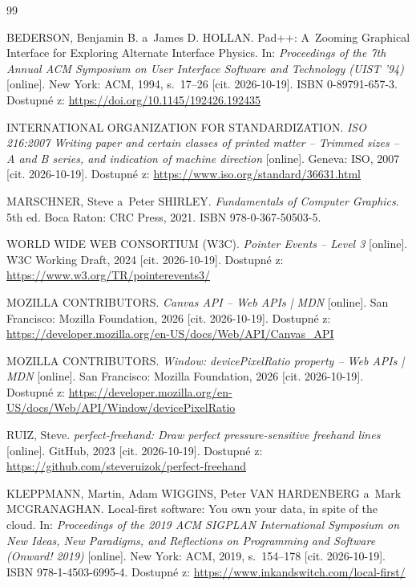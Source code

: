 \documentclass[12pt, a4paper, oneside]{article}
\begin{document}
\begingroup
\sloppy
\renewcommand{\section}[2]{}%
\begin{thebibliography}{99}

    BEDERSON, Benjamin B. a~James D. HOLLAN. Pad++: A~Zooming Graphical Interface for Exploring Alternate Interface Physics. In: \textit{Proceedings of the 7th Annual ACM Symposium on User Interface Software and Technology (UIST '94)} [online]. New York: ACM, 1994, s.~17--26 [cit. 2026-10-19]. ISBN 0-89791-657-3. Dostupné z: \url{https://doi.org/10.1145/192426.192435}

    INTERNATIONAL ORGANIZATION FOR STANDARDIZATION. \textit{ISO 216:2007 Writing paper and certain classes of printed matter -- Trimmed sizes -- A and B series, and indication of machine direction} [online]. Geneva: ISO, 2007 [cit. 2026-10-19]. Dostupné z: \url{https://www.iso.org/standard/36631.html}

    MARSCHNER, Steve a~Peter SHIRLEY. \textit{Fundamentals of Computer Graphics}. 5th ed. Boca Raton: CRC Press, 2021. ISBN 978-0-367-50503-5.

    WORLD WIDE WEB CONSORTIUM (W3C). \textit{Pointer Events -- Level 3} [online]. W3C Working Draft, 2024 [cit. 2026-10-19]. Dostupné z: \url{https://www.w3.org/TR/pointerevents3/}

    MOZILLA CONTRIBUTORS. \textit{Canvas API -- Web APIs | MDN} [online]. San Francisco: Mozilla Foundation, 2026 [cit. 2026-10-19]. Dostupné z: \url{https://developer.mozilla.org/en-US/docs/Web/API/Canvas_API}

    MOZILLA CONTRIBUTORS. \textit{Window: devicePixelRatio property -- Web APIs | MDN} [online]. San Francisco: Mozilla Foundation, 2026 [cit. 2026-10-19]. Dostupné z: \url{https://developer.mozilla.org/en-US/docs/Web/API/Window/devicePixelRatio}

    RUIZ, Steve. \textit{perfect-freehand: Draw perfect pressure-sensitive freehand lines} [online]. GitHub, 2023 [cit. 2026-10-19]. Dostupné z: \url{https://github.com/steveruizok/perfect-freehand}

    KLEPPMANN, Martin, Adam WIGGINS, Peter VAN HARDENBERG a~Mark MCGRANAGHAN. Local-first software: You own your data, in spite of the cloud. In: \textit{Proceedings of the 2019 ACM SIGPLAN International Symposium on New Ideas, New Paradigms, and Reflections on Programming and Software (Onward! 2019)} [online]. New York: ACM, 2019, s.~154--178 [cit. 2026-10-19]. ISBN 978-1-4503-6995-4. Dostupné z: \url{https://www.inkandswitch.com/local-first/}


\end{thebibliography}
\end{document}
